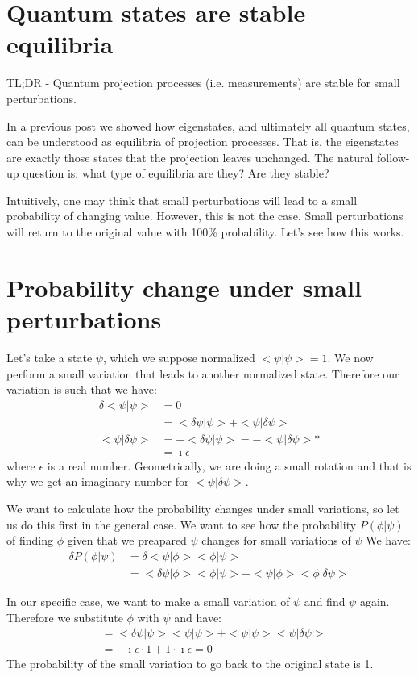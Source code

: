 \documentclass[aps,pra,10pt,floatfix,nofootinbib]{revtex4-2}
\theoremstyle{definition}
\begin{document}
\section{Quantum states are stable equilibria}
TL;DR - Quantum projection processes (i.e. measurements) are stable for small perturbations.

In a previous post we showed how eigenstates, and ultimately all quantum states, can be understood as equilibria of projection processes. That is, the eigenstates are exactly those states that the projection leaves unchanged. The natural follow-up question is: what type of equilibria are they? Are they stable?

Intuitively, one may think that small perturbations will lead to a small probability of changing value. However, this is not the case. Small perturbations will return to the original value with 100\% probability. Let's see how this works.

\section{Probability change under small perturbations}

Let's take a state $\psi$, which we suppose normalized $<\psi|\psi>=1$. We now perform a small variation that leads to another normalized state. Therefore our variation is such that we have:
\begin{align*}
	\delta <\psi|\psi> &= 0 \\
	&= <\delta \psi|\psi> + <\psi|\delta \psi> \\
	<\psi|\delta \psi> &= - <\delta \psi|\psi> = - <\psi|\delta \psi>* \\
	&= \imath \epsilon
\end{align*}
where $\epsilon$ is a real number. Geometrically, we are doing a small rotation and that is why we get an imaginary number for $<\psi|\delta \psi>$.

We want to calculate how the probability changes under small variations, so let us do this first in the general case. We want to see how the probability $P(\phi|\psi)$ of finding $\phi$ given that we preapared $\psi$ changes for small variations of $\psi$ We have:
\begin{align*}
	\delta P(\phi|\psi) &= \delta <\psi|\phi><\phi|\psi> \\
	&= <\delta \psi|\phi><\phi|\psi> + <\psi|\phi><\phi|\delta \psi>
\end{align*}

In our specific case, we want to make a small variation of $\psi$ and find $\psi$ again. Therefore we substitute $\phi$ with $\psi$ and have:
\begin{align*}
	&= <\delta \psi|\psi><\psi|\psi> + <\psi|\psi><\psi|\delta \psi> \\
	&= - \imath \epsilon \cdot 1 + 1 \cdot \imath \epsilon = 0
\end{align*}
The probability of the small variation to go back to the original state is 1.
\end{document}
